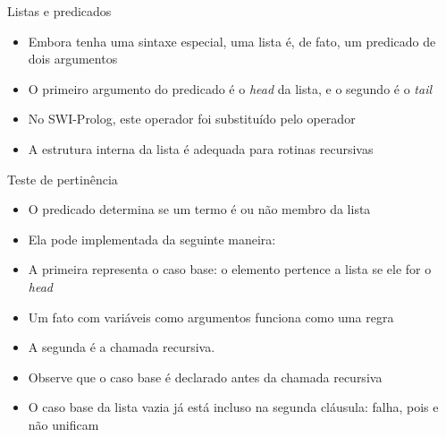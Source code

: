 \begin{frame}[fragile]{Listas e predicados}

    \begin{itemize}
        \item Embora tenha uma sintaxe especial, uma lista é, de fato, um predicado de dois 
            argumentos

        \item O primeiro argumento do predicado  é o \textit{head} da lista, 
            e o segundo é o \textit{tail}

        \item No SWI-Prolog, este operador foi substituído pelo operador


        \item A estrutura interna da lista é adequada para rotinas recursivas

    \end{itemize}

\end{frame}

\begin{frame}[fragile]{Teste de pertinência}

    \begin{itemize}
        \item O predicado  determina se um termo é ou não membro da 
            lista

        \item Ela pode implementada da seguinte maneira:


        \item A primeira representa o caso base: o elemento pertence a lista se ele for o 
            \textit{head}

        \item Um fato com variáveis como argumentos funciona como uma regra

        \item A segunda é a chamada recursiva.

        \item Observe que o caso base é declarado antes da chamada recursiva

        \item O caso base da lista vazia já está incluso na segunda cláusula: 
             falha, pois  e 
             não unificam

    \end{itemize}

\end{frame}

